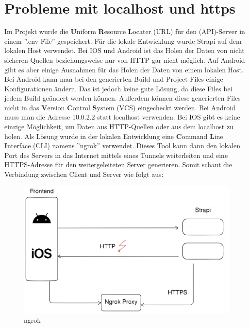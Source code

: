 

\section{Probleme mit localhost und https}\label{sec:probleme-mit-localhost-und-https}

Im Projekt wurde  die \textbf{U}niform \textbf{R}esource
\textbf{L}ocater (URL) für den (API)-Server in einem ''.env-File'' gespeichert.
Für die lokale Entwicklung wurde Strapi auf dem lokalen Host verwendet.
Bei IOS und Android ist das Holen der Daten von nicht sicheren Quellen
beziehungsweise nur von HTTP gar nicht möglich. Auf Android gibt es aber einige
Ausnahmen für das Holen der Daten von einem lokalen Host.
Bei Android kann man bei den generierten Build und Project Files einige Konfigurationen ändern.
Das ist jedoch keine gute Lösung, da diese Files bei jedem Build geändert werden können.
Außerdem können diese generierten Files nicht in das \textbf{V}ersion \textbf{C}ontrol \textbf{S}ystem (VCS)
eingecheckt werden.
Bei Android muss man die Adresse 10.0.2.2 statt localhost verwenden.\cite{androidFetch}
Bei IOS gibt es keine einzige Möglichkeit,
um Daten aus HTTP-Quellen oder aus dem localhost zu holen.
Als Lösung wurde in der lokalen Entwicklung eine \textbf{C}ommand \textbf{L}ine \textbf{I}nterface (CLI) namens ''ngrok'' verwendet.
Dieses Tool kann dann den lokalen Port des Servers in das Internet mittels eines Tunnels weiterleiten
und eine HTTPS-Adresse für den weitergeleiteten Server generieren. Somit schaut die Verbindung zwischen Client und Server wie folgt aus:
\begin{figure}[H]
    \centering
    \includegraphics[width=\textwidth]{./pics/https-dev}
    \caption{ngrok}
\end{figure}

